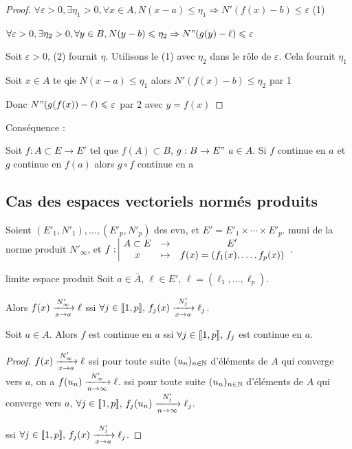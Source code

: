 \begin{proof}
    $\forall \varepsilon > 0, \exists \eta_1 > 0, \forall x \in A, N(x - a) \leqslant \eta_1 \Rightarrow N'(f(x) - b) \leqslant \varepsilon$ (1)

    $\forall \varepsilon > 0, \exists \eta_2 > 0, \forall y \in B, N(y - b) \leqslant \eta_2 \Rightarrow N"(g(y) - \ell) \leqslant \varepsilon$

    Soit $\varepsilon > 0$, (2) fournit $\eta$. Utilisons le (1) avec $\eta_2$ dans le rôle 
    de $\varepsilon$. Cela fournit $\eta_1$

    Soit $x \in A$ te qie $N(x - a) \leqslant \eta_1$ alors $N'(f(x) - b) \leqslant \eta_2$ par 1

    Donc $N"(g(f(x)) - \ell) \leqslant \varepsilon$ par 2 avec $y = f(x)$
\end{proof}

Conséquence : 

Soit $f : A \subset E \to E'$ tel que $f(A) \subset B$, $g : B \to E"$ $a \in A$. Si $f$ continue en $a$ et $g$ continue en $f(a)$ alors $g \circ f$ continue en a 


\subsection{Cas des espaces vectoriels normés produits}

Soient $(E'_1, N'_1), \ldots, (E'_p, N'_p)$ des evn, et $E' = E'_1 \times \cdots \times E'_p$.
muni de la norme produit $N'_\infty$, et $\fonction{f}{A\subset E}{E'}{x}{f(x) = (f_1(x), \ldots, f_p(x))}$.


\begin{proposition}{limite espace produit}{}
    Soit $a \in \overline A$, $\ell \in E', \, \ell = (\ell_1, \ldots, \ell_p)$.

    Alors $f(x) \limitnorme{N'_\infty}{x}{a} \ell$ ssi $\forall j \in \ninter{1}{p}, \, f_j(x) \limitnorme{N'_j}{x}{a} \ell_j$.

\end{proposition}


Soit $a \in A$. Alors $f$ est continue en $a$ ssi $\forall j \in \ninter{1}{p}, \, f_j$ est continue en $a$.


\begin{proof}
    $f(x) \limitnorme{N'_\infty}{x}{a} \ell$ ssi pour toute suite $(u_n)_{n \in \N}$ 
    d'éléments de $A$ qui converge vers $a$, on a $f(u_n) \limitnorme{N'_\infty}{n}{\infty} \ell$.
    ssi pour toute suite $(u_n)_{n \in \N}$ d'éléments de $A$ qui converge vers $a$, 
    $\forall j \in \ninter{1}{p}, \, f_j(u_n) \limitnorme{N'_j}{n}{\infty} \ell_j$.

    ssi $\forall j \in \ninter{1}{p}, \, f_j(x) \limitnorme{N'_j}{x}{a} \ell_j$.
\end{proof}



